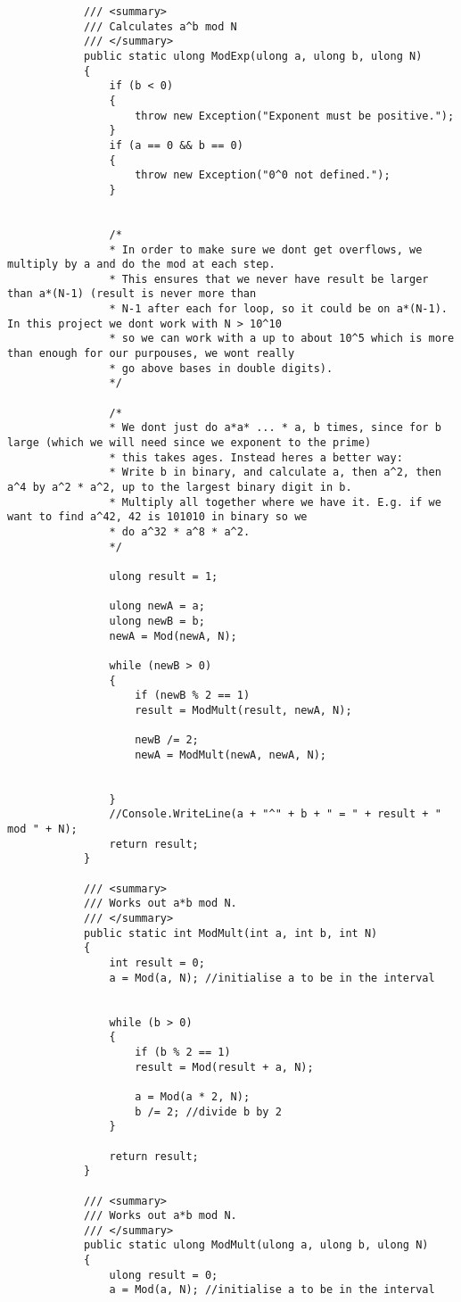 \documentclass{article}
\begin{document}
\begin{lstlisting}
			/// <summary>
			/// Calculates a^b mod N
			/// </summary>
			public static ulong ModExp(ulong a, ulong b, ulong N)
			{
				if (b < 0)
				{
					throw new Exception("Exponent must be positive.");
				}
				if (a == 0 && b == 0)
				{
					throw new Exception("0^0 not defined.");
				}
				
				
				/*
				* In order to make sure we dont get overflows, we multiply by a and do the mod at each step.
				* This ensures that we never have result be larger than a*(N-1) (result is never more than
				* N-1 after each for loop, so it could be on a*(N-1). In this project we dont work with N > 10^10
				* so we can work with a up to about 10^5 which is more than enough for our purpouses, we wont really
				* go above bases in double digits).
				*/
				
				/*
				* We dont just do a*a* ... * a, b times, since for b large (which we will need since we exponent to the prime)
				* this takes ages. Instead heres a better way:
				* Write b in binary, and calculate a, then a^2, then a^4 by a^2 * a^2, up to the largest binary digit in b.
				* Multiply all together where we have it. E.g. if we want to find a^42, 42 is 101010 in binary so we
				* do a^32 * a^8 * a^2.
				*/
				
				ulong result = 1;
				
				ulong newA = a;
				ulong newB = b;
				newA = Mod(newA, N);
				
				while (newB > 0)
				{
					if (newB % 2 == 1)
					result = ModMult(result, newA, N);
					
					newB /= 2;
					newA = ModMult(newA, newA, N);
					
					
				}
				//Console.WriteLine(a + "^" + b + " = " + result + " mod " + N);
				return result;
			}
			
			/// <summary>
			/// Works out a*b mod N.
			/// </summary>
			public static int ModMult(int a, int b, int N)
			{
				int result = 0;
				a = Mod(a, N); //initialise a to be in the interval
				
				
				while (b > 0)
				{
					if (b % 2 == 1)
					result = Mod(result + a, N);
					
					a = Mod(a * 2, N);
					b /= 2; //divide b by 2
				}
				
				return result;
			}
			
			/// <summary>
			/// Works out a*b mod N.
			/// </summary>
			public static ulong ModMult(ulong a, ulong b, ulong N)
			{
				ulong result = 0;
				a = Mod(a, N); //initialise a to be in the interval
				

\end{lstlisting}
\end{document}
